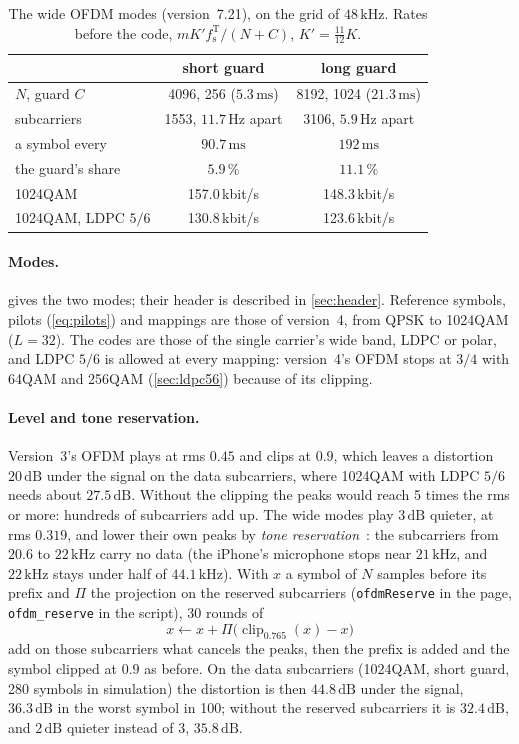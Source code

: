 \documentclass[11pt,a4paper]{article}
\newcommand{\kHz}{\,\mathrm{kHz}}
\newcommand{\Hz}{\,\mathrm{Hz}}
\newcommand{\ms}{\,\mathrm{ms}}
\newcommand{\dB}{\,\mathrm{dB}}
\newcommand{\code}[1]{\texttt{#1}}
\newcommand{\fsT}{f_{\mathrm{s}}^{\mathrm{T}}}
\theoremstyle{remark}
\begin{document}
\begin{table}[ht]
\centering
\caption{The wide OFDM modes (version~7.21), on the grid of $48\kHz$. Rates before the code, $m K' \fsT/(N + C)$, $K' = \tfrac{11}{12}K$.}
\label{tab:ofdmwide}
\small
\begin{tabular}{lcc}
\toprule
& short guard & long guard\\
\midrule
$N$, guard $C$ & 4096, 256 ($5.3\ms$) & 8192, 1024 ($21.3\ms$)\\
subcarriers & 1553, $11.7\Hz$ apart & 3106, $5.9\Hz$ apart\\
a symbol every & $90.7\ms$ & $192\ms$\\
the guard's share & $5.9\,\%$ & $11.1\,\%$\\
1024QAM & 157.0\,kbit/s & 148.3\,kbit/s\\
1024QAM, LDPC $5/6$ & 130.8\,kbit/s & 123.6\,kbit/s\\
\bottomrule
\end{tabular}
\end{table}

\paragraph{Modes.}
 gives the two modes; their header is described in \cref{sec:header}. Reference symbols, pilots (\cref{eq:pilots}) and mappings are those of version~4, from QPSK to 1024QAM ($L = 32$). The codes are those of the single carrier's wide band, LDPC or polar, and LDPC $5/6$ is allowed at every mapping: version~4's OFDM stops at $3/4$ with 64QAM and 256QAM (\cref{sec:ldpc56}) because of its clipping.

\paragraph{Level and tone reservation.}
Version~3's OFDM plays at rms $0.45$ and clips at $0.9$, which leaves a distortion $20\dB$ under the signal on the data subcarriers, where 1024QAM with LDPC $5/6$ needs about $27.5\dB$. Without the clipping the peaks would reach 5 times the rms or more: hundreds of subcarriers add up. The wide modes play $3\dB$ quieter, at rms $0.319$, and lower their own peaks by \emph{tone reservation}~\cite{tellado}: the subcarriers from $20.6$ to $22\kHz$ carry no data (the iPhone's microphone stops near $21\kHz$, and $22\kHz$ stays under half of $44.1\kHz$). With $x$ a symbol of $N$ samples before its prefix and $\Pi$ the projection on the reserved subcarriers (\code{ofdmReserve} in the page, \code{ofdm\_reserve} in the script), 30 rounds of
\begin{equation}
x \leftarrow x + \Pi\bigl(\operatorname{clip}_{0.765}(x) - x\bigr)
\end{equation}
add on those subcarriers what cancels the peaks, then the prefix is added and the symbol clipped at $0.9$ as before. On the data subcarriers (1024QAM, short guard, 280 symbols in simulation) the distortion is then $44.8\dB$ under the signal, $36.3\dB$ in the worst symbol in 100; without the reserved subcarriers it is $32.4\dB$, and $2\dB$ quieter instead of 3, $35.8\dB$.
\end{document}
